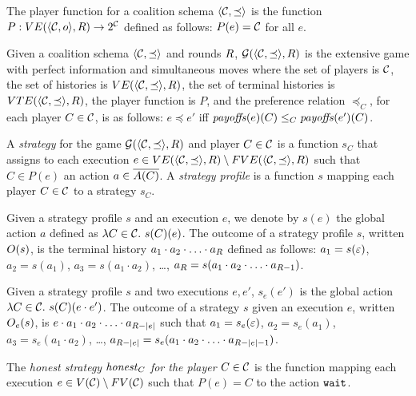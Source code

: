 %
The player function for a coalition schema $\tup{\coalitionSchema,\preceq}$ is the function $P: VE(\tup{\coalitionSchema,o},\rounds) \to \powerset{\coalitionSchema}$ defined as follows:
%
$P(e) = \coalitionSchema$ for all $e$.


%
Given a coalition schema $\tup{\coalitionSchema,\preceq}$ and rounds $\rounds$,  $\game{\tup{\coalitionSchema,\preceq},\rounds}$ is the extensive game with perfect information and simultaneous moves where the set of players is $\coalitionSchema$, the set of histories is $VE(\tup{\coalitionSchema,\preceq},\rounds)$, the set of terminal histories is $VTE(\tup{\coalitionSchema,\preceq},\rounds)$, the player function is $P$, and the preference relation $\preceq_C$, for each player $C \in \coalitionSchema$, is as follows: $e \preceq e'$ iff $\payoffs(e)(C) \leq_C \payoffs(e')(C)$.



%
A \textit{strategy} for the game $\game{\tup{\coalitionSchema,\preceq},\rounds}$ and player $C \in \coalitionSchema$ is a function $s_C$ that assigns to each execution $e \in VE(\tup{\coalitionSchema,\preceq},\rounds) \setminus FVE(\tup{\coalitionSchema,\preceq},\rounds)$ such that $C \in P(e)$ an action $a \in \coalitionActions{C}$.
%
A \textit{strategy profile} is a function $s$ mapping each player $C \in \coalitionSchema$ to a strategy $s_C$. 

Given a strategy profile $s$ and an execution $e$, we denote by $s(e)$ the global action $a$ defined as $\lambda C \in \coalitionSchema.\ s(C)(e)$.
%
The outcome of a strategy profile $s$, written $\outcome{s}$, is the terminal history $a_1 \cdot a_2 \cdot \ldots \cdot a_\rounds$ defined as follows:
%
$a_1 = s(\emptysequence)$, $a_2 = s(a_1)$, $a_3 = s( a_1 \cdot a_2)$, \ldots, $a_\rounds = s(a_1 \cdot a_2 \cdot \ldots \cdot a_{\rounds-1})$.


Given a strategy profile $s$ and two executions $e,e'$, $s_e(e')$ is the global action $\lambda C \in \coalitionSchema.\ s(C)(e\concat e')$.
%
The outcome of a strategy $s$ given an execution $e$, written $\subgameOutcome{s}{e}$, is $e \concat a_1 \concat a_2 \concat \ldots \concat a_{\rounds - |e|}$ such that $a_1 = s_e(\emptysequence)$, $a_2 = s_e(a_1)$, $a_3 = s_e( a_1 \cdot a_2)$, \ldots, $a_{\rounds - |e|} = s_e(a_1 \cdot a_2 \cdot \ldots \cdot a_{\rounds - |e|-1})$.

The \textit{honest strategy $\honest_C$ for the player $C \in \coalitionSchema$} is the function mapping each execution $e \in V(\coalitionSchema) \setminus FV(\coalitionSchema)$ such that $P(e) = C$ to the action $\wait$.




